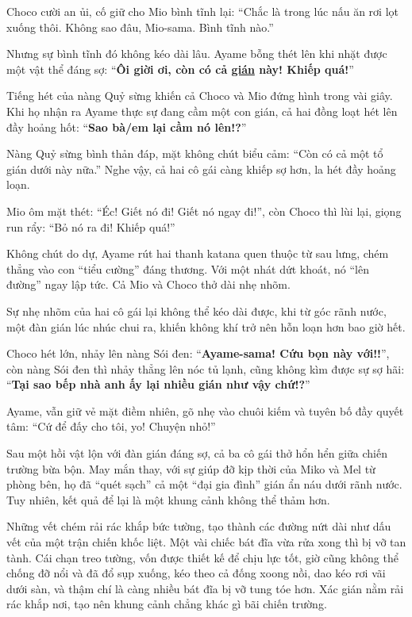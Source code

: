\documentclass[../main.tex]{subfiles}
\begin{document}
Choco cười an ủi, cố giữ cho Mio bình tĩnh lại: ``Chắc là trong lúc nấu ăn rơi lọt xuống thôi. Không sao đâu, Mio-sama. Bình tĩnh nào.''

Nhưng sự bình tĩnh đó không kéo dài lâu. Ayame bỗng thét lên khi nhặt được một vật thể đáng sợ: ``\textbf{Ôi giời ơi, còn có cả \uline{gián} này! Khiếp quá!}''

Tiếng hét của nàng Quỷ sừng khiến cả Choco và Mio đứng hình trong vài giây. Khi họ nhận ra Ayame thực sự đang cầm một con gián, cả hai đồng loạt hét lên đầy hoảng hốt: ``\textbf{Sao bà/em lại cầm nó lên!?}''

Nàng Quỷ sừng bình thản đáp, mặt không chút biểu cảm: ``Còn có cả một tổ gián dưới này nữa.'' Nghe vậy, cả hai cô gái càng khiếp sợ hơn, la hét đầy hoảng loạn.

Mio ôm mặt thét: ``Éc! Giết nó đi! Giết nó ngay đi!'', còn Choco thì lùi lại, giọng run rẩy: ``Bỏ nó ra đi! Khiếp quá!''

Không chút do dự, Ayame rút hai thanh katana quen thuộc từ sau lưng, chém thẳng vào con ``tiểu cường'' đáng thương. Với một nhát dứt khoát, nó ``lên đường'' ngay lập tức. Cả Mio và Choco thở dài nhẹ nhõm.

Sự nhẹ nhõm của hai cô gái lại không thể kéo dài được, khi từ góc rãnh nước, một đàn gián lúc nhúc chui ra, khiến không khí trở nên hỗn loạn hơn bao giờ hết.

Choco hét lớn, nhảy lên nàng Sói đen: ``\textbf{Ayame-sama! Cứu bọn này với!!}'', còn nàng Sói đen thì nhảy thẳng lên nóc tủ lạnh, cũng không kìm được sự sợ hãi: ``\textbf{Tại sao bếp nhà anh ấy lại nhiều gián như vậy chứ!?}''

Ayame, vẫn giữ vẻ mặt điềm nhiên, gõ nhẹ vào chuôi kiếm và tuyên bố đầy quyết tâm: ``Cứ để đấy cho tôi, yo! Chuyện nhỏ!''

\ct

Sau một hồi vật lộn với đàn gián đáng sợ, cả ba cô gái thở hổn hển giữa chiến trường bừa bộn. May mắn thay, với sự giúp đỡ kịp thời của Miko và Mel từ phòng bên, họ đã ``quét sạch'' cả một ``đại gia đình'' gián ẩn náu dưới rãnh nước. Tuy nhiên, kết quả để lại là một khung cảnh không thể thảm hơn.

Những vết chém rải rác khắp bức tường, tạo thành các đường nứt dài như dấu vết của một trận chiến khốc liệt. Một vài chiếc bát đĩa vừa rửa xong thì bị vỡ tan tành. Cái chạn treo tường, vốn được thiết kế để chịu lực tốt, giờ cũng không thể chống đỡ nổi và đã đổ sụp xuống, kéo theo cả đống xoong nồi, dao kéo rơi vãi dưới sàn, và thậm chí là càng nhiều bát đĩa bị vỡ tung tóe hơn. Xác gián nằm rải rác khắp nơi, tạo nên khung cảnh chẳng khác gì bãi chiến trường.
\end{document}
